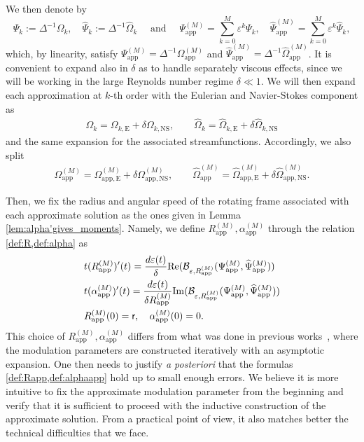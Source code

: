 \documentclass[11pt,reqno,a4paper]{amsart}
\def\eps{\varepsilon}
\def\Re{{\rm Re}}
\def\Im{{\rm Im}}
\newcommand{\cB}{\mathcal{B}}
\newcommand{\1}{\mathbbm{1}}
\theoremstyle{definition}
\theoremstyle{definition}
\numberwithin{equation}{section}
\newcommand{\Mapp}[2]{#1^{(#2)}_\mathrm{app}}
\newcommand{\Mappp}[3]{#1^{(#2)}_\mathrm{app,#3}}
\begin{document}
We then denote by
\begin{equation}
    \Psi_k := \Delta^{-1}\Omega_k , \quad \widehat{\Psi}_k := \Delta^{-1}\widehat{\Omega}_k \quad \text{ and } \quad  \Mapp{\Psi}{M} = \sum_{k=0}^M\eps^k \Psi_k, \quad \Mapp{\widehat{\Psi}}{M} = \sum_{k=0}^M \eps^k\widehat{\Psi}_k,
\end{equation}
which, by linearity, satisfy $\Mapp{\Psi}{M} =  \Delta^{-1}\Mapp{\Omega}{M}$ and $\Mapp{\widehat{\Psi}}{M} =  \Delta^{-1}\Mapp{\widehat{\Omega}}{M}$. 
It is convenient to expand also in $\delta$ as to handle separately viscous effects, since we will be working in the large Reynolds number regime $\delta\ll1$. We will then expand each approximation at $k$-th order with the Eulerian and Navier-Stokes component as 
\begin{align}
\label{def:OmkexpNS}
\Omega_{k}=\Omega_{k,\mathrm{E}}+\delta\Omega_{k,\mathrm{NS}}, \qquad \widehat{\Omega}_k=\widehat{\Omega}_{k,\mathrm{E}}+\delta \widehat{\Omega}_{k,\mathrm{NS}}
\end{align}
    and the same expansion for the associated streamfunctions.
Accordingly, we also split 
\begin{align}
\Mapp{\Omega}{M}=\Mappp{\Omega}{M}{E}+\delta\Mappp{\Omega}{M}{NS}, \qquad \Mapp{\widehat{\Omega}}{M}=\Mappp{\widehat{\Omega}}{M}{E}+\delta\Mappp{\widehat{\Omega}}{M}{NS}.
\end{align}


Then, we fix the radius and angular speed of the rotating frame associated with each approximate solution as the ones given in Lemma \ref{lem:alpha'gives_moments}. Namely, we define $\Mapp{R}{M},\Mapp{\alpha}{M}$ through the relation \cref{def:R,def:alpha} as
    \begin{align}
            \label{def:Rapp} & t (\Mapp{R}{M})'(t) = \frac{d \eps(t)}{\delta } \Re( \cB_{\eps,\Mapp{R}{M}}(\Mapp{\Psi}{M},\Mapp{\widehat{\Psi}}{M}))\\
            \label{def:alphaapp}&t (\Mapp{\alpha}{M})'(t) = \frac{d \eps(t)}{\delta \Mapp{R}{M}}  \Im(\cB_{\eps,\Mapp{R}{M}}(\Mapp{\Psi}{M},\Mapp{\widehat{\Psi}}{M})) \\
            &\Mapp{R}{M}(0)=\mathsf{r}, \quad  \Mapp{\alpha}{M}(0) = 0.
    \end{align}
This choice of $\Mapp{R}{M},\Mapp{\alpha}{M}$ differs from what was done in previous works~\cite{dolce2024long,zhang2025long}, where the modulation parameters are constructed iteratively with an asymptotic expansion. One then needs to justify \emph{a posteriori} that the formulas \cref{def:Rapp,def:alphaapp} hold up to small enough errors. We believe it is more intuitive to fix the approximate modulation parameter from the beginning and verify that it is sufficient to proceed with the inductive construction of the approximate solution. From a practical point of view, it also matches better the technical difficulties that we face. \medskip 
\end{document}
